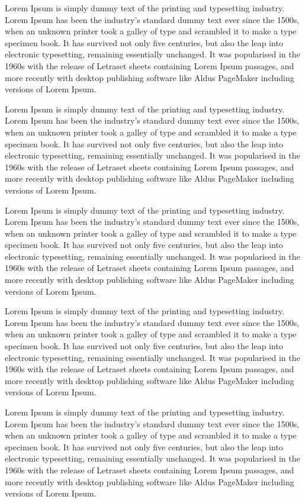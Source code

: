 \documentclass[conference]{IEEEtran}
\begin{document}
Lorem Ipsum is simply dummy text of the printing and typesetting industry. Lorem Ipsum has been the industry's standard dummy text ever since the 1500s, when an unknown printer took a galley of type and scrambled it to make a type specimen book. It has survived not only five centuries, but also the leap into electronic typesetting, remaining essentially unchanged. It was popularised in the 1960s with the release of Letraset sheets containing Lorem Ipsum passages, and more recently with desktop publishing software like Aldus PageMaker including versions of Lorem Ipsum.

Lorem Ipsum is simply dummy text of the printing and typesetting industry. Lorem Ipsum has been the industry's standard dummy text ever since the 1500s, when an unknown printer took a galley of type and scrambled it to make a type specimen book. It has survived not only five centuries, but also the leap into electronic typesetting, remaining essentially unchanged. It was popularised in the 1960s with the release of Letraset sheets containing Lorem Ipsum passages, and more recently with desktop publishing software like Aldus PageMaker including versions of Lorem Ipsum.

Lorem Ipsum is simply dummy text of the printing and typesetting industry. Lorem Ipsum has been the industry's standard dummy text ever since the 1500s, when an unknown printer took a galley of type and scrambled it to make a type specimen book. It has survived not only five centuries, but also the leap into electronic typesetting, remaining essentially unchanged. It was popularised in the 1960s with the release of Letraset sheets containing Lorem Ipsum passages, and more recently with desktop publishing software like Aldus PageMaker including versions of Lorem Ipsum.

Lorem Ipsum is simply dummy text of the printing and typesetting industry. Lorem Ipsum has been the industry's standard dummy text ever since the 1500s, when an unknown printer took a galley of type and scrambled it to make a type specimen book. It has survived not only five centuries, but also the leap into electronic typesetting, remaining essentially unchanged. It was popularised in the 1960s with the release of Letraset sheets containing Lorem Ipsum passages, and more recently with desktop publishing software like Aldus PageMaker including versions of Lorem Ipsum.

Lorem Ipsum is simply dummy text of the printing and typesetting industry. Lorem Ipsum has been the industry's standard dummy text ever since the 1500s, when an unknown printer took a galley of type and scrambled it to make a type specimen book. It has survived not only five centuries, but also the leap into electronic typesetting, remaining essentially unchanged. It was popularised in the 1960s with the release of Letraset sheets containing Lorem Ipsum passages, and more recently with desktop publishing software like Aldus PageMaker including versions of Lorem Ipsum.
\end{document}
